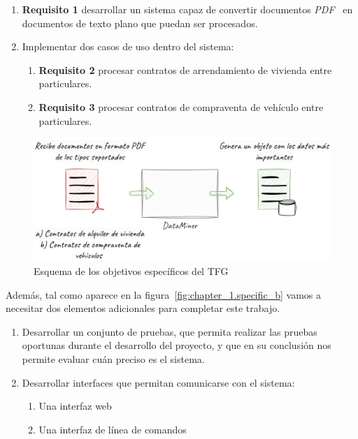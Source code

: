 \begin{enumerate}
    \item
    \textbf{Requisito 1} desarrollar un sistema capaz de convertir documentos \textit{PDF}~\cite{url_adobe_pdf}
    en documentos de texto plano que puedan ser procesados\label{req:transform_pdf_to_text}.
    \item
    Implementar dos casos de uso dentro del sistema:
    \begin{enumerate}
        \item
        \textbf{Requisito 2} procesar contratos de arrendamiento de vivienda entre
        particulares\label{req:residence_lease_agreement}.
        \item
        \textbf{Requisito 3} procesar contratos de compraventa de vehículo entre
        particulares\label{req:sale_and_purchase_agreement}.
    \end{enumerate}
\end{enumerate}

\begin{figure}[ht]
    \begin{center}
        \includegraphics[width=\textwidth]{chapter/1/images/chapter_1.specific_a}
        \caption{Esquema de los objetivos específicos del TFG}
        \label{fig:chapter_1.specific_a}
    \end{center}
\end{figure}

Además, tal como aparece en la figura~\ref{fig:chapter_1.specific_b} vamos a necesitar dos elementos adicionales para
completar este trabajo.

\begin{enumerate}
    \item Desarrollar un conjunto de pruebas, que permita realizar las pruebas oportunas durante el desarrollo del
    proyecto, y que en su conclusión nos permite evaluar cuán preciso es el sistema.
    \item Desarrollar interfaces que permitan comunicarse con el sistema:
    \begin{enumerate}
        \item  Una interfaz web
        \item  Una interfaz de línea de comandos
    \end{enumerate}
\end{enumerate}

